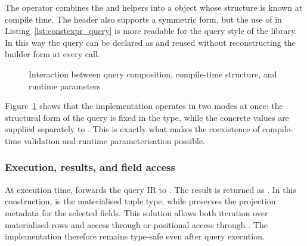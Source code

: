 The operator \code{\&} combines the  and  helpers into a  object whose structure is known at compile time. The header  also supports a symmetric \code{*} form, but the use of \code{\&} in Listing~\ref{lst:constexpr_query} is more readable for the query style of the library. In this way the query can be declared as  and reused without reconstructing the builder form at every call.

\begin{figure}[H]
\centering
{}
\caption{Interaction between query composition, compile-time structure, and runtime parameters}
\label{fig:query_composition_execution}
\end{figure}

Figure~\ref{fig:query_composition_execution} shows that the implementation operates in two modes at once: the structural form of the query is fixed in the type, while the concrete values are supplied separately to . This is exactly what makes the coexistence of compile-time validation and runtime parameterisation possible.

\subsubsection{Execution, results, and field access}

At execution time,  forwards the query IR to . The result is returned as . In this construction,  is the materialised tuple type, while  preserves the projection metadata for the selected fields. This solution allows both iteration over materialised rows and access through  or positional access through . The implementation therefore remains type-safe even after query execution.

